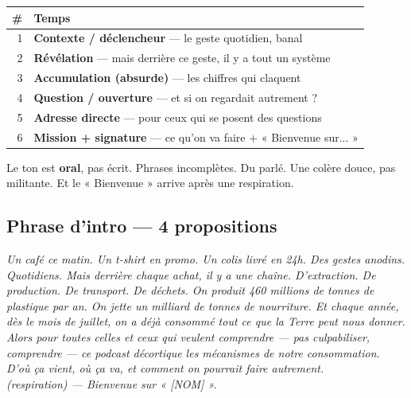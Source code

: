 \documentclass[a4paper,11pt]{article}
\newcommand{\tableheader}{\rowcolor{tableHeader}\bfseries}
\begin{document}
\begin{tcolorbox}[card]
\begin{tabularx}{\textwidth}{@{}rX@{}}
\toprule
\tableheader \# & Temps \\
\midrule
1 & \textbf{Contexte / déclencheur} — le geste quotidien, banal \\
2 & \textbf{Révélation} — mais derrière ce geste, il y a tout un système \\
3 & \textbf{Accumulation (absurde)} — les chiffres qui claquent \\
4 & \textbf{Question / ouverture} — et si on regardait autrement ? \\
5 & \textbf{Adresse directe} — pour ceux qui se posent des questions \\
6 & \textbf{Mission + signature} — ce qu'on va faire + « Bienvenue sur... » \\
\bottomrule
\end{tabularx}
\end{tcolorbox}

\noindent Le ton est \textbf{oral}, pas écrit. Phrases incomplètes. Du parlé. Une colère douce, pas militante. Et le « Bienvenue » arrive après une respiration.

\subsection{Phrase d'intro — 4 propositions}

\begin{tcolorbox}[highlight card, title=Option 1 — « Le geste anodin » (neutre $\rightarrow$ r\'ev\'elation)]
\textit{Un café ce matin. Un t-shirt en promo. Un colis livré en 24h. Des gestes anodins. Quotidiens. Mais derrière chaque achat, il y a une chaîne. D'extraction. De production. De transport. De déchets. On produit 460 millions de tonnes de plastique par an. On jette un milliard de tonnes de nourriture. Et chaque année, dès le mois de juillet, on a déjà consommé tout ce que la Terre peut nous donner.}\\[4pt]
\textit{Alors pour toutes celles et ceux qui veulent comprendre — pas culpabiliser, comprendre — ce podcast décortique les mécanismes de notre consommation. D'où ça vient, où ça va, et comment on pourrait faire autrement.}\\[4pt]
\textit{(respiration) — Bienvenue sur « [NOM] ».}
\end{tcolorbox}
\end{document}
